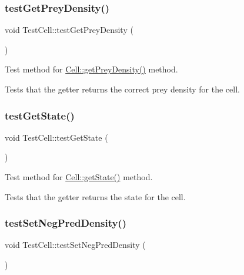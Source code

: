 \subsubsection{\texorpdfstring{test\+Get\+Prey\+Density()}{testGetPreyDensity()}}
{\footnotesize\ttfamily void Test\+Cell\+::test\+Get\+Prey\+Density (\begin{DoxyParamCaption}{ }\end{DoxyParamCaption})\hspace{0.3cm}{\ttfamily [protected]}}



Test method for \hyperlink{class_cell_a0756af1c045a1488e2b4c2c16d87eec2}{Cell\+::get\+Prey\+Density()} method. 

Tests that the getter returns the correct prey density for the cell. \mbox{\label{class_test_cell_a5c2b39f6303c1ff791a000418f1edc6e}} 
\subsubsection{\texorpdfstring{test\+Get\+State()}{testGetState()}}
{\footnotesize\ttfamily void Test\+Cell\+::test\+Get\+State (\begin{DoxyParamCaption}{ }\end{DoxyParamCaption})\hspace{0.3cm}{\ttfamily [protected]}}



Test method for \hyperlink{class_cell_ab8c8914c6eb76fa53c4e77e692792435}{Cell\+::get\+State()} method. 

Tests that the getter returns the state for the cell. \mbox{\label{class_test_cell_ac4beab5199462222e9b4d761d4e6c544}} 
\subsubsection{\texorpdfstring{test\+Set\+Neg\+Pred\+Density()}{testSetNegPredDensity()}}
{\footnotesize\ttfamily void Test\+Cell\+::test\+Set\+Neg\+Pred\+Density (\begin{DoxyParamCaption}{ }\end{DoxyParamCaption})\hspace{0.3cm}{\ttfamily [protected]}}




